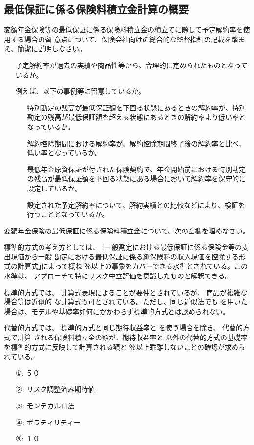 \documentclass[report,gutter=10mm,fore-edge=10mm,uplatex,dvipdfmx]{jlreq}
\begin{document}
{\subsection{最低保証に係る保険料積立金計算の概要}
変額年金保険等の最低保証に係る保険料積立金の積立てに際して予定解約率を使用する場合の留
意点について、保険会社向けの総合的な監督指針の記載を踏まえ、簡潔に説明しなさい。
\answer{}
\begin{itemize}
\item[]  予定解約率が過去の実績や商品性等から、合理的に定められたものとなっているか。
\item[]  例えば、以下の事例等に留意しているか。
\begin{itemize}
\item[]  特別勘定の残高が最低保証額を下回る状態にあるときの解約率が、特別勘定の残高が最低保証額を超える状態にあるときの解約率より低い率となっているか。
\item[]  解約控除期間における解約率が、解約控除期間終了後の解約率と比べ、低い率となっているか。
\item[]  最低年金原資保証が付された保険契約で、年金開始前における特別勘定の残高が最低保証額を下回る状態にある場合において解約率を保守的に設定しているか。
\item[]  設定された予定解約率について、解約実績との比較などにより、検証を行うこととなっているか。
\end{itemize}
\end{itemize}

変額年金保険の最低保証に係る保険料積立金について、次の空欄を埋めなさい。

標準的方式の考え方としては、 ｢一般勘定における最低保証に係る保険金等の支出現価から一般
勘定における最低保証に係る純保険料の収入現価を控除する形式の計算式｣によって概ね
％以上の事象をカバーできる水準とされている。この水準は、
アプローチで特にリスク中立評価を意識したものと解釈できる。

標準的方式では、 計算式表現によることが要件とされているが、 商品が複雑な場合等は近似的
な計算式も可とされている。ただし、同じ近似法でも
を用いた場合は、モデルや基礎率如何にかかわらず標準的方式とは認められない。

代替的方式では、 標準的方式と同じ期待収益率と
を使う場合を除き、 代替的方式で計算
される保険料積立金の額が、期待収益率と
以外の代替的方式の基礎率を標準的方式に反映して計算される額と
％以上乖離しないことの確認が求められている。
\answer{}
\begin{itemize}
 \item[①: ]  ５０
 \item[②: ]  リスク調整済み期待値
 \item[③: ]  モンテカルロ法
 \item[④: ]  ボラティリティー
 \item[⑤: ]  １０
\end{itemize}

}
\end{document}
